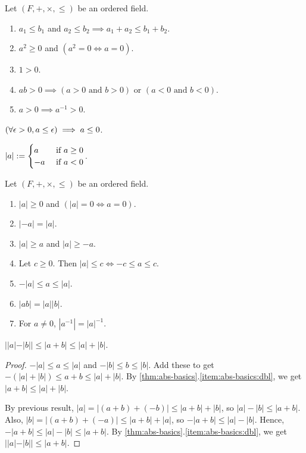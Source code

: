 \documentclass[a4paper, 12pt, fleqn]{article}
\begin{document}
\begin{lemma}
Let $(F, +, \times, \le)$ be an ordered field.
\begin{enumerate}
\item $a_1 \le b_1$ and $a_2 \le b_2 \implies a_1 + a_2 \le b_1 + b_2$.
\item $a^2 \ge 0$ and $(a^2 = 0 \iff a = 0)$.
\item $1 > 0$.
\item $ab > 0 \implies (a > 0 \textrm{ and } b > 0) \textrm{ or } (a < 0 \textrm{ and } b < 0)$.
\item $a > 0 \implies a^{-1} > 0$.
\end{enumerate}
\end{lemma}

\begin{lemma}
$(\forall \epsilon > 0, a \le \epsilon) \implies a \le 0$.
\end{lemma}

\begin{definition}
$\displaystyle |a| := \begin{cases} a & \textrm{ if } a \ge 0
\\ -a & \textrm{ if } a < 0 \end{cases}$.
\end{definition}

\begin{lemma}
\label{thm:abs-basics}
Let $(F, +, \times, \le)$ be an ordered field.
\begin{enumerate}
\item $|a| \ge 0$ and $(|a| = 0 \iff a = 0)$.
\item $|-a| = |a|$.
\item $|a| \ge a$ and $|a| \ge -a$.
\item \label{item:abs-basics:dbl}Let $c \ge 0$. Then $|a| \le c \iff -c \le a \le c$.
\item $-|a| \le a \le |a|$.
\item $|ab| = |a||b|$.
\item For $a \neq 0$, $|a^{-1}| = |a|^{-1}$.
\end{enumerate}
\end{lemma}

\begin{lemma}
$||a|-|b|| \le |a + b| \le |a| + |b|$.
\end{lemma}
\begin{proof}
$-|a| \le a \le |a|$ and $-|b| \le b \le |b|$.
Add these to get $-(|a|+|b|) \le a + b \le |a| + |b|$.
By \cref{thm:abs-basics}.\ref{item:abs-basics:dbl}, we get $|a + b| \le |a| + |b|$.

By previous result, $|a| = |(a+b) + (-b)| \le |a+b| + |b|$, so $|a|-|b| \le |a+b|$.
Also, $|b| = |(a+b) + (-a)| \le |a+b| + |a|$, so $-|a+b| \le |a|-|b|$.
Hence, $-|a+b| \le |a|-|b| \le |a+b|$.
By \cref{thm:abs-basics}.\ref{item:abs-basics:dbl}, we get $||a|-|b|| \le |a+b|$.
\end{proof}
\end{document}
